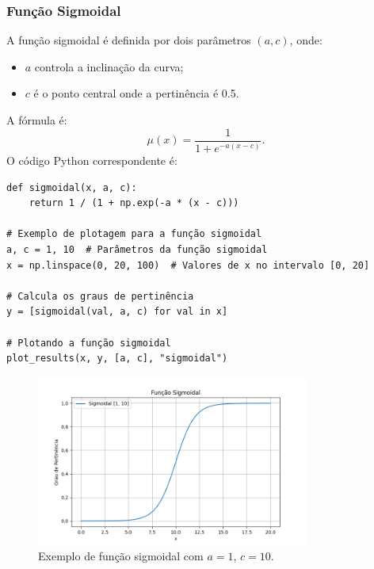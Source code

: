 \documentclass[a4paper,12pt]{article}
\begin{document}
\subsubsection{Função Sigmoidal}
A função sigmoidal é definida por dois parâmetros $(a, c)$, onde:
\begin{itemize}
    \item $a$ controla a inclinação da curva;
    \item $c$ é o ponto central onde a pertinência é 0.5.
\end{itemize}
A fórmula é:
\[
\mu(x) = \frac{1}{1 + e^{-a(x - c)}}.
\]
O código Python correspondente é:
\begin{verbatim}
def sigmoidal(x, a, c):
    return 1 / (1 + np.exp(-a * (x - c)))

# Exemplo de plotagem para a função sigmoidal
a, c = 1, 10  # Parâmetros da função sigmoidal
x = np.linspace(0, 20, 100)  # Valores de x no intervalo [0, 20]

# Calcula os graus de pertinência
y = [sigmoidal(val, a, c) for val in x]

# Plotando a função sigmoidal
plot_results(x, y, [a, c], "sigmoidal")
\end{verbatim}

\begin{figure}[H]
    \centering
    \includegraphics[width=0.8\textwidth]{img/sigmoidal.png}
    \caption{Exemplo de função sigmoidal com $a=1$, $c=10$.}
\end{figure}
\end{document}
